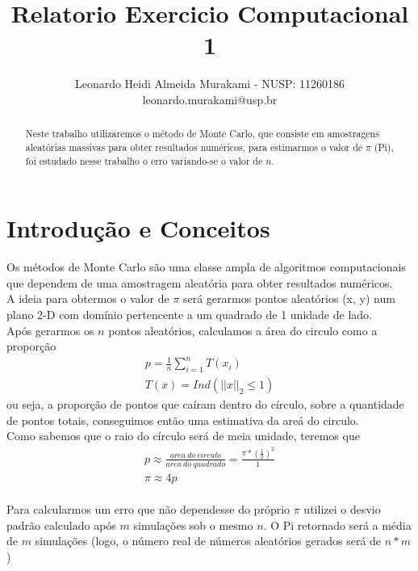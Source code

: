 \documentclass[twocolumn,amsmath,amssymb,floatfix]{revtex4}
\begin{document}

\title{Relatorio Exercicio Computacional 1}

\author{Leonardo Heidi Almeida Murakami - NUSP: 11260186 \\\small leonardo.murakami@usp.br} 

\begin{abstract}
\baselineskip 11pt
Neste trabalho utilizaremos o método de Monte Carlo, que consiste em amostragens aleatórias massivas para obter resultados numéricos, para estimarmos o valor de $\pi$ (Pi), foi estudado nesse trabalho o erro variando-se o valor de $n$.
\end{abstract}

\maketitle
\section{Introdução e Conceitos}

\indent Os métodos de Monte Carlo são uma classe ampla de algoritmos computacionais que dependem de uma amostragem aleatória para obter resultados numéricos. 
\\\indent A ideia para obtermos o valor de $\pi$ será gerarmos pontos aleatórios (x, y) num plano 2-D com domínio pertencente a um quadrado de 1 unidade de lado.
\\\indent Após gerarmos os $n$ pontos aleatórios, calculamos a área do circulo como a proporção
\begin{eqnarray}
  p = \frac{1}{n}\sum_{i=1}^{n}T(x_i)
  \\
  T(x) = Ind(||x||_2 \leq 1) 
\end{eqnarray}
ou seja, a proporção de pontos que caíram dentro do círculo, sobre a quantidade de pontos totais, conseguimos então uma estimativa da areá do circulo.
\\\indent Como sabemos que o raio do círculo será de meia unidade, teremos que
\begin{eqnarray}
  p \approx \frac{area \ do \ circulo}{area \ do \ quadrado} = \frac{\pi * (\frac{1}{2})^2}{1}
  \\
  \pi \approx 4p
\end{eqnarray}
\\\indent Para calcularmos um erro que não dependesse do próprio $\pi$ utilizei o desvio padrão calculado após $m$ simulações sob o mesmo $n$. O Pi retornado será a média de $m$ simulações (logo, o número real de números aleatórios gerados será de $n*m$)
\end{document}
